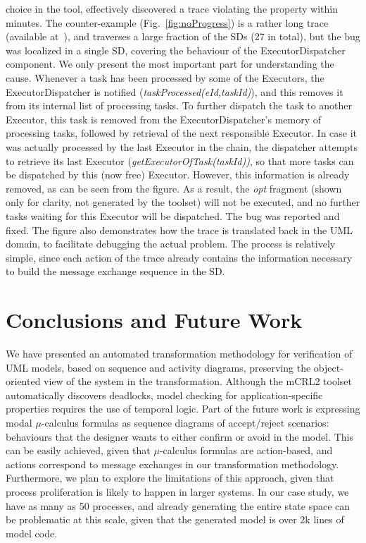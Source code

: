 \documentclass[letter]{llncs}
\newcommand{\secshrink}{\vspace{-.5cm}}
\newcommand{\secshrinkbegin}{\vspace{-.2cm}}
\begin{document}
choice in the tool,
effectively discovered
a trace violating the property within minutes. The counter-example (Fig.~\ref{fig:noProgress}) is a rather long trace (available at~\cite{repo:remenska}), 
and traverses a large fraction of the SDs (27 in total), but the bug was localized in a single SD, covering the behaviour of 
the ExecutorDispatcher component. 
We only present the most important part for understanding the cause. 
Whenever a task has been processed by some of 
the Executors, the ExecutorDispatcher is notified (\emph{taskProcessed(eId,taskId)}), and this removes it from its internal list 
of processing tasks. To further dispatch the task to another Executor, this task is removed from the ExecutorDispatcher's memory of processing tasks,
followed by retrieval of the next responsible Executor. In case it was actually processed by the last Executor in the chain, the
 dispatcher attempts to retrieve its last Executor (\emph{getExecutorOfTask(taskId))}, so that more tasks can be dispatched by 
this (now free) Executor. However, this information
is already removed, as can be seen from the figure. As a result, the \emph{opt} fragment (shown only for clarity, not generated by the toolset)
will not be executed, and no further tasks waiting for this Executor will be dispatched. The bug was reported and fixed.
The figure also demonstrates how the trace is translated back in the UML domain, 
to facilitate debugging the actual problem. The process is relatively simple, since each action of the trace already 
contains the information necessary 
to build the message exchange sequence in the SD.
\secshrink
\vspace{-1 pt}
\section{Conclusions and Future Work}
\label{sec:Conclusions}
\secshrinkbegin
\vspace{-4 pt}
We have presented an automated transformation methodology for verification of UML models, based on sequence and 
activity diagrams, preserving the object-oriented view of the system in the transformation. 
Although the mCRL2 toolset automatically discovers deadlocks, model checking for application-specific properties 
requires the use of temporal logic.
Part of the future work is expressing modal $\mu$-calculus formulas as sequence diagrams of accept/reject scenarios: 
behaviours that the designer wants to either confirm or avoid in the model. This can be easily achieved, given that
$\mu$-calculus formulas are action-based, and actions correspond to message exchanges in our transformation methodology.
Furthermore, we plan to explore the limitations of this approach, given that process proliferation is likely to happen
in larger systems. In our case study, we have as many as 50 processes, and already generating the entire state space can be problematic
at this scale, given that the generated model is over 2k lines of model code.
\end{document}
